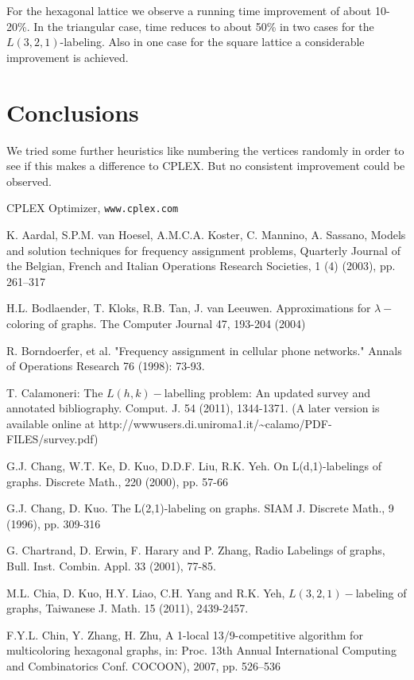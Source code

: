 \documentclass[smallextended]{svjour3}
\begin{document}
For the hexagonal lattice we observe a running time improvement of about 10-20\%. 
In the triangular case, time reduces to about 50\% in two cases for the $L(3,2,1)$-labeling. 
Also in one case for the square lattice a considerable improvement is achieved. 

\section{Conclusions} 

We tried some further heuristics like numbering the vertices randomly in order 
to see if this makes a difference to CPLEX. But no consistent improvement 
could be observed. 

\begin{thebibliography}{1} 
CPLEX Optimizer, \texttt{www.cplex.com} 

K. Aardal, S.P.M. van Hoesel, A.M.C.A. Koster, C. Mannino, A. Sassano, Models and solution techniques for frequency assignment problems, Quarterly Journal of the Belgian, French and Italian Operations Research Societies, 1 (4) (2003), pp. 261–317

H.L. Bodlaender, T. Kloks, R.B. Tan, J. van Leeuwen. 
Approximations for $\lambda-$coloring of graphs. The Computer Journal 
47, 193-204 (2004) 

R. Borndoerfer, et al. "Frequency assignment in cellular phone networks." Annals of Operations Research 76 (1998): 73-93.

T. Calamoneri: The $L(h,k)-$labelling problem: 
An updated survey and annotated bibliography. Comput. J. 54 (2011), 
1344-1371. (A later version is available online at http://wwwusers.di.uniroma1.it/\textasciitilde{}calamo/PDF-FILES/survey.pdf) 

G.J. Chang, W.T. Ke, D. Kuo, D.D.F. Liu, R.K. Yeh. 
On L(d,1)-labelings of graphs. Discrete Math., 220 (2000), 
pp. 57-66 

G.J. Chang, D. Kuo. The L(2,1)-labeling on graphs. 
SIAM J. Discrete Math., 9 (1996), pp. 309-316 

G. Chartrand, D. Erwin, F. Harary and P. Zhang, Radio Labelings of graphs, Bull. Inst. Combin. Appl. 33 (2001), 77-85.

M.L. Chia, D. Kuo, H.Y. Liao, C.H. Yang and R.K. Yeh, 
$L(3,2,1)-$labeling of graphs, Taiwanese J. Math. 15 (2011), 
2439-2457. 

F.Y.L. Chin, Y. Zhang, H. Zhu, A 1-local 13/9-competitive algorithm for multicoloring hexagonal graphs, in: Proc. 13th Annual International Computing and Combinatorics Conf. COCOON), 2007, pp. 526–536


\end{thebibliography}
\end{document}
